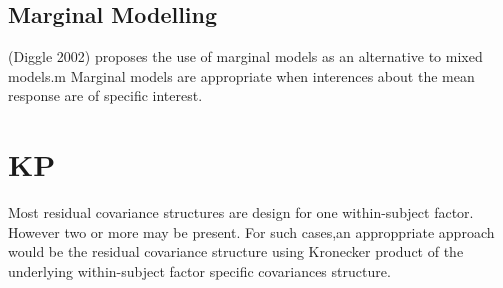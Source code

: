 \subsection{Marginal Modelling}
(Diggle 2002) proposes the use of marginal models as an
alternative to mixed models.m Marginal models are appropriate when
interences about the mean response are of specific interest.
\section{KP}
Most residual covariance structures are design for one
within-subject factor. However two or more may be present. For
such cases,an approppriate approach would be the residual
covariance structure using Kronecker product of the underlying
within-subject factor specific covariances structure.
